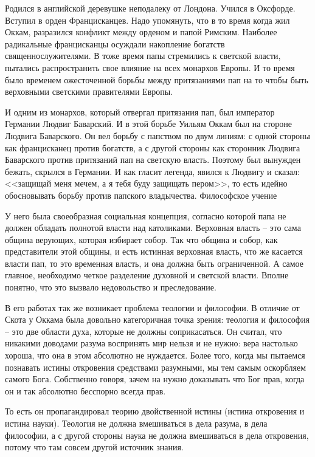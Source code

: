 Родился в английской деревушке неподалеку от Лондона. Учился в Оксфорде. Вступил в орден Францисканцев. Надо упомянуть, что в то время когда жил Оккам, разразился конфликт между орденом и папой Римским. Наиболее радикальные францисканцы осуждали накопление богатств священнослужителями. В тоже время папы стремились к светской власти, пытались распространить свое влияние на всех монархов Европы. И то время было временем ожесточенной борьбы между притязаниями пап на то чтобы быть верховными светскими правителями Европы.

И одним из монархов, который отвергал притязания пап, был император Германии Людвиг Баварский. И в этой борьбе Уильям Оккам был на стороне Людвига Баварского. Он вел борьбу с папством по двум линиям: с одной стороны как францисканец против богатств, а с другой стороны как сторонник Людвига Баварского против притязаний пап на светскую власть. Поэтому был вынужден бежать, скрылся в Германии. И как гласит легенда, явился к Людвигу и сказал: <<защищай меня мечем, а я тебя буду защищать пером>>, то есть идейно обосновывать борьбу против папского владычества.
Философское учение

У него была своеобразная социальная концепция, согласно которой папа не должен обладать полнотой власти над католиками. Верховная власть – это сама община верующих, которая избирает собор. Так что община и собор, как представители этой общины, и есть истинная верховная власть, что же касается власти пап, то это временная власть, и она должна быть ограниченной. А самое главное, необходимо четкое разделение духовной и светской власти. Вполне понятно, что это вызвало недовольство и преследование.

В его работах так же возникает проблема теологии и философии. В отличие от Скота у Оккама была довольно категоричная точка зрения: теология и философия – это две области духа, которые не должны соприкасаться. Он считал, что никакими доводами разума воспринять мир нельзя и не нужно: вера настолько хороша, что она в этом абсолютно не нуждается. Более того, когда мы пытаемся познавать истины откровения средствами разумными, мы тем самым оскорбляем самого Бога. Собственно говоря, зачем на нужно доказывать что Бог прав, когда он и так абсолютно бесспорно всегда прав.

    То есть он пропагандировал теорию двойственной истины (истина откровения и истина науки). Теология не должна вмешиваться в дела разума, в дела философии, а с другой стороны наука не должна вмешиваться в дела откровения, потому что там совсем другой источник знания.


